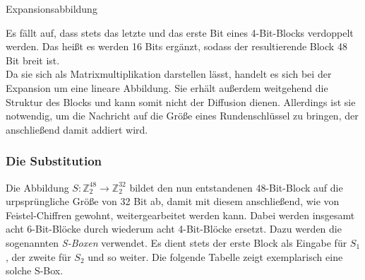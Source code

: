 \documentclass[
10pt, %
a4paper, %
oneside, %
headinclude,footinclude, %
BCOR5mm, %
]{scrartcl}
\begin{document}
	\begin{table}[ht]
	
	\caption{Expansionsabbildung \cite[52]{2}}
	\label{tab:exp}
	\end{table}
	
	Es fällt auf, dass stets das letzte und das erste Bit eines 4-Bit-Blocks verdoppelt werden. Das heißt es werden 16 Bits ergänzt, sodass der resultierende Block 48 Bit breit ist. \cite[52]{2} \\
	Da sie sich als Matrixmultiplikation darstellen lässt, handelt es sich bei der Expansion um eine lineare Abbildung. Sie erhält außerdem weitgehend die Struktur des Blocks und kann somit nicht der Diffusion dienen. Allerdings ist sie notwendig, um die Nachricht auf die Größe eines Rundenschlüssel zu bringen, der anschließend damit addiert wird.
	
	\subsubsection{Die Substitution}
	Die Abbildung $ S: \mathbb{Z}^{48}_2 \rightarrow \mathbb{Z}^{32}_2 $ bildet den nun entstandenen 48-Bit-Block auf die urpsprüngliche Größe von 32 Bit ab, damit mit diesem anschließend, wie von Feistel-Chiffren gewohnt, weitergearbeitet werden kann. Dabei werden insgesamt acht 6-Bit-Blöcke durch wiederum acht 4-Bit-Blöcke ersetzt. Dazu werden die sogenannten \emph{S-Boxen} verwendet. Es dient stets der erste Block als Eingabe für $S_1$, der zweite für $S_2$ und so weiter. Die folgende Tabelle zeigt exemplarisch eine solche S-Box.
	
\end{document}
